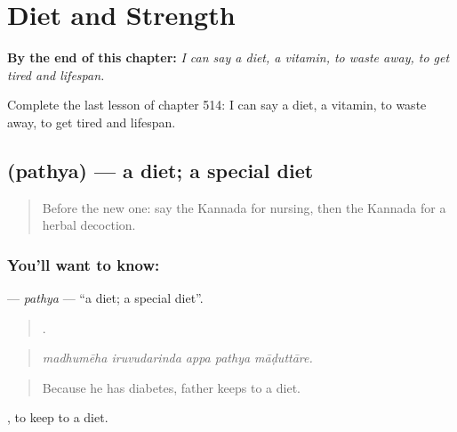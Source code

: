 
\chapter{Diet and Strength}
\label{ch:ka-diet-and-strength}

\begin{chapteropening}
\textbf{By the end of this chapter:} \emph{I can say a diet, a vitamin, to waste away, to get tired and lifespan.}

Complete the last lesson of chapter 514: I can say a diet, a vitamin, to waste away, to get tired and lifespan.
\end{chapteropening}

\section[\texorpdfstring{\kn{ಪಥ್ಯ} (pathya)}{ಪಥ್ಯ (pathya)}]{ (pathya) — a diet; a special diet}

\label{lesson:KA-C514-pathya}



\begin{quote}
Before the new one: say the Kannada for nursing, then the Kannada for a herbal decoction.
\end{quote}

\subsection*{You'll want to know: }
\textbf{} — \emph{pathya} — \textquotedblleft{}a diet; a special diet\textquotedblright{}.

\begin{quote}
    .
\end{quote}

\begin{quote}
\emph{madhumēha iruvudarinda appa pathya māḍuttāre.}
\end{quote}

\begin{quote}
Because he has diabetes, father keeps to a diet.
\end{quote}

 , to keep to a diet.

